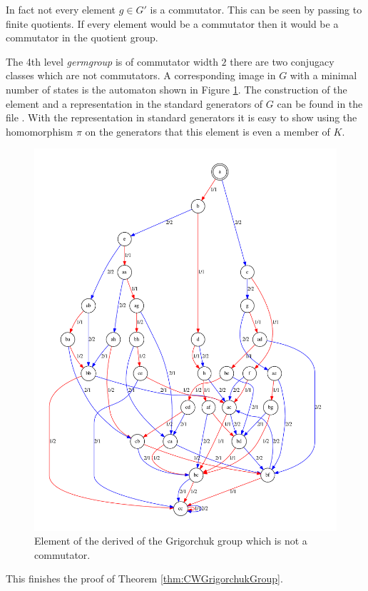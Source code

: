 \documentclass[a4paper,11pt]{amsart}
\begin{document}
In fact not every element $g\in G'$ is a commutator. This can be seen by passing to finite quotients. If every element would be a commutator then
it would be a commutator in the quotient group. 

The 4th level \emph{germgroup} is of commutator width $2$ there are two conjugacy classes which are 
not commutators. A corresponding image in $G$ with a minimal number of states is the automaton shown in Figure \ref{fig:noncomm}. 
The construction of the element and a representation in the standard generators of $G$ can be found in the file
 . With the representation in standard generators it is easy to show using the 
 homomorphism $\pi$ on the generators that this element is even a member of $K$.
\begin{figure}
 \includegraphics[width=\textwidth]{gap/PCD/noncomm29states}
 \caption{Element of the derived of the Grigorchuk group which is not a commutator.}\label{fig:noncomm}
\end{figure}
This finishes the proof of Theorem \ref{thm:CWGrigorchukGroup}.
\end{document}
